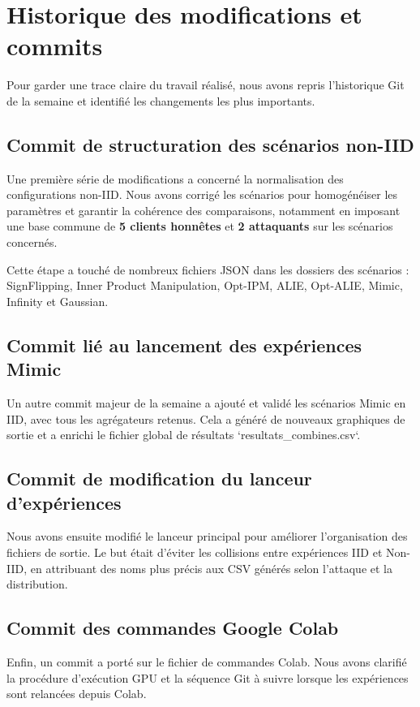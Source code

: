 \documentclass[11pt, a4paper]{article}
\begin{document}
\section{Historique des modifications et commits}
Pour garder une trace claire du travail réalisé, nous avons repris l'historique Git de la semaine et identifié les changements les plus importants.

\subsection{Commit de structuration des scénarios non-IID}
Une première série de modifications a concerné la normalisation des configurations non-IID. Nous avons corrigé les scénarios pour homogénéiser les paramètres et garantir la cohérence des comparaisons, notamment en imposant une base commune de \textbf{5 clients honnêtes} et \textbf{2 attaquants} sur les scénarios concernés.

Cette étape a touché de nombreux fichiers JSON dans les dossiers des scénarios : SignFlipping, Inner Product Manipulation, Opt-IPM, ALIE, Opt-ALIE, Mimic, Infinity et Gaussian.

\subsection{Commit lié au lancement des expériences Mimic}
Un autre commit majeur de la semaine a ajouté et validé les scénarios Mimic en IID, avec tous les agrégateurs retenus. Cela a généré de nouveaux graphiques de sortie et a enrichi le fichier global de résultats `resultats_combines.csv`.

\subsection{Commit de modification du lanceur d'expériences}
Nous avons ensuite modifié le lanceur principal pour améliorer l'organisation des fichiers de sortie. Le but était d'éviter les collisions entre expériences IID et Non-IID, en attribuant des noms plus précis aux CSV générés selon l'attaque et la distribution.

\subsection{Commit des commandes Google Colab}
Enfin, un commit a porté sur le fichier de commandes Colab. Nous avons clarifié la procédure d'exécution GPU et la séquence Git à suivre lorsque les expériences sont relancées depuis Colab.
\end{document}
